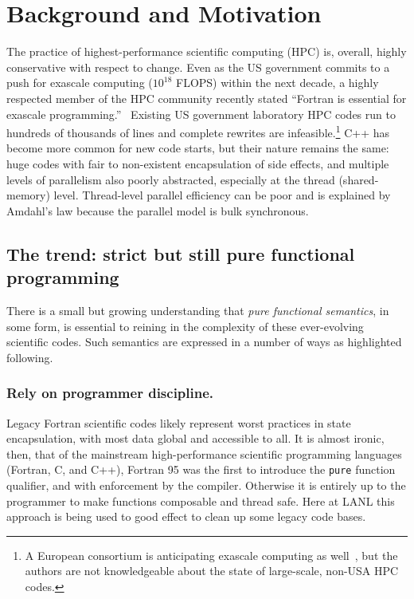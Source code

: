 \documentclass{llncs}
\begin{document}
\section{Background and Motivation}
The practice of highest-performance scientific computing (HPC) is, overall,
highly conservative with respect to change.  Even as the US government commits
to a push for exascale computing ($10^{18}$ FLOPS) within the next decade, a
highly respected member of the HPC community recently stated ``Fortran is
essential for exascale programming.''~\cite{Heroux16} Existing US government
laboratory HPC codes run to hundreds of thousands of lines and complete
rewrites are infeasible.\footnote{A European consortium is anticipating
  exascale computing as well~\cite{EUexascale}, but the authors are not
  knowledgeable about the state of large-scale, non-USA HPC codes.}  C++ has
become more common for new code starts, but their nature remains the same:
huge codes with fair to non-existent encapsulation of side effects, and
multiple levels of parallelism also poorly abstracted, especially at the
thread (shared-memory) level.  Thread-level parallel efficiency can be poor
and is explained by Amdahl's law because the parallel model is bulk
synchronous.

\subsection{The trend: strict but still pure functional programming}
There is a small but growing understanding that \emph{pure functional
  semantics}, in some form, is essential to reining in the complexity of these
ever-evolving scientific codes.  Such semantics are expressed in a number
of ways as highlighted following.

\subsubsection{Rely on programmer discipline.}
Legacy Fortran scientific codes likely represent worst practices in state
encapsulation, with most data global and accessible to all.  It is almost
ironic, then, that of the mainstream high-performance scientific programming
languages (Fortran, C, and C++), Fortran 95 was the first to introduce the
\texttt{pure} function qualifier, and with enforcement by the compiler.
Otherwise it is entirely up to the programmer to make functions composable
and thread safe.  Here at LANL this approach is being used to good effect
to clean up some legacy code bases.
\end{document}
